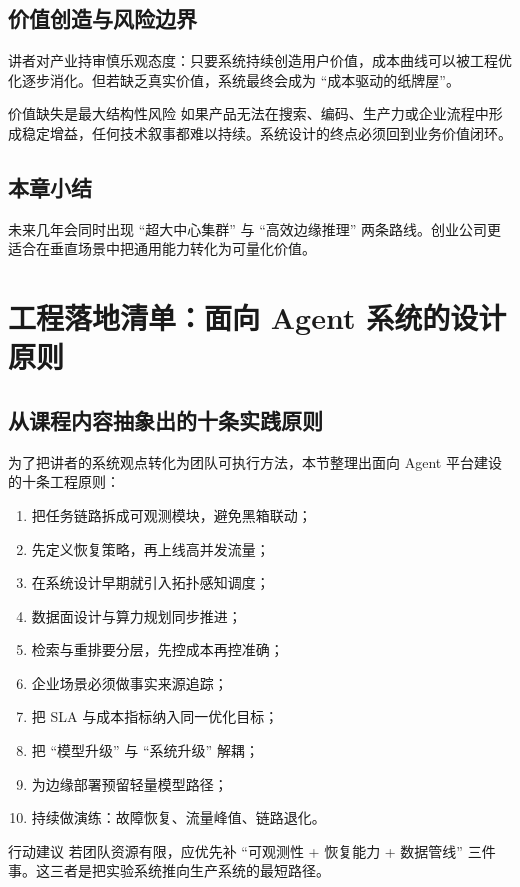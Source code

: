 \documentclass[a4paper]{article}
\begin{document}
\subsection{价值创造与风险边界}
讲者对产业持审慎乐观态度：只要系统持续创造用户价值，成本曲线可以被工程优化逐步消化。但若缺乏真实价值，系统最终会成为 ``成本驱动的纸牌屋''。

\begin{warningbox}{价值缺失是最大结构性风险}
如果产品无法在搜索、编码、生产力或企业流程中形成稳定增益，任何技术叙事都难以持续。系统设计的终点必须回到业务价值闭环。
\end{warningbox}

\subsection{本章小结}
未来几年会同时出现 ``超大中心集群'' 与 ``高效边缘推理'' 两条路线。创业公司更适合在垂直场景中把通用能力转化为可量化价值。

\section{工程落地清单：面向 Agent 系统的设计原则}

\subsection{从课程内容抽象出的十条实践原则}
为了把讲者的系统观点转化为团队可执行方法，本节整理出面向 Agent 平台建设的十条工程原则：
\begin{enumerate}
    \item 把任务链路拆成可观测模块，避免黑箱联动；
    \item 先定义恢复策略，再上线高并发流量；
    \item 在系统设计早期就引入拓扑感知调度；
    \item 数据面设计与算力规划同步推进；
    \item 检索与重排要分层，先控成本再控准确；
    \item 企业场景必须做事实来源追踪；
    \item 把 SLA 与成本指标纳入同一优化目标；
    \item 把 ``模型升级'' 与 ``系统升级'' 解耦；
    \item 为边缘部署预留轻量模型路径；
    \item 持续做演练：故障恢复、流量峰值、链路退化。
\end{enumerate}

\begin{importantbox}{行动建议}
若团队资源有限，应优先补 ``可观测性 + 恢复能力 + 数据管线'' 三件事。这三者是把实验系统推向生产系统的最短路径。
\end{importantbox}
\end{document}
